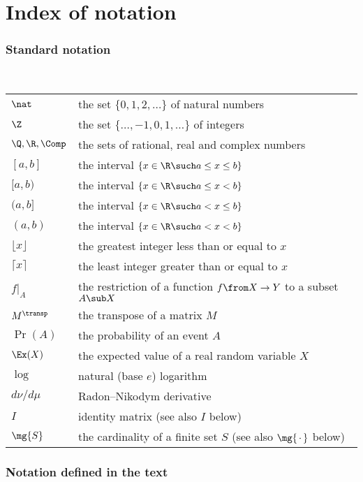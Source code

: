 \chapter*{Index of notation}
\smallish

\subsection*{Standard notation}

\setlength{\parindent}{0em}%
\ \\
\begin{tabular}{ll}
$\nat$& the set $\{0, 1, 2, \ldots\}$ of natural numbers\\
$\Z$& the set $\{ \ldots, -1, 0, 1, \ldots \}$ of integers\\
$\Q, \R, \Comp$& the sets of rational, real and complex numbers\\
$[a, b]$& the interval $\{ x \in \R \such a \leq x \leq b \}$\\
$[a, b)$& the interval $\{ x \in \R \such a \leq x < b \}$\\
$(a, b]$& the interval $\{ x \in \R \such a < x \leq b \}$\\
$(a, b)$& the interval $\{ x \in \R \such a < x < b \}$\\
$\lfloor x \rfloor$& the greatest integer less than or equal to $x$\\
$\lceil x \rceil$& the least integer greater than or equal to $x$\\
$f|_A$& the restriction of a function $f \from X \to Y$ to a subset $A \sub X$\\
$M^\transp$& the transpose of a matrix $M$\\
$\Pr(A)$& the probability of an event $A$\\
$\Ex(X)$& the expected value of a real random variable $X$\\
$\log$& natural (base $e$) logarithm\\
$d\nu/d\mu$& Radon--Nikodym derivative\\
$I$& identity matrix (see also $I$ below)\\
$\mg{S}$& the cardinality of a finite set $S$ (see also $\mg{\,\cdot\,}$ below)
\end{tabular}


\subsection*{Notation defined in the text}

